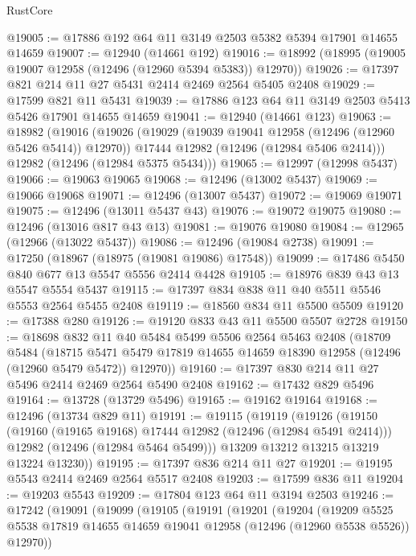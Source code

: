 \begin{lexlean}{RustCore}
\begin{coremodule}
@19005 := @17886 @192 @64 @11 @3149 @2503 @5382 @5394 @17901 @14655 @14659
@19007 := @12940 (@14661 @192)
@19016 := @18992 (@18995 (@19005 @19007 @12958 (@12496 (@12960 @5394 @5383)) @12970))
@19026 := @17397 @821 @214 @11 @27 @5431 @2414 @2469 @2564 @5405 @2408
@19029 := @17599 @821 @11 @5431
@19039 := @17886 @123 @64 @11 @3149 @2503 @5413 @5426 @17901 @14655 @14659
@19041 := @12940 (@14661 @123)
@19063 := @18982
    (@19016
      (@19026
        (@19029 (@19039 @19041 @12958 (@12496 (@12960 @5426 @5414)) @12970))
        @17444
        @12982
        (@12496 (@12984 @5406 @2414)))
      @12982
      (@12496 (@12984 @5375 @5434)))
@19065 := @12997 (@12998 @5437)
@19066 := @19063 @19065
@19068 := @12496 (@13002 @5437)
@19069 := @19066 @19068
@19071 := @12496 (@13007 @5437)
@19072 := @19069 @19071
@19075 := @12496 (@13011 @5437 @43)
@19076 := @19072 @19075
@19080 := @12496 (@13016 @817 @43 @13)
@19081 := @19076 @19080
@19084 := @12965 (@12966 (@13022 @5437))
@19086 := @12496 (@19084 @2738)
@19091 := @17250 (@18967 (@18975 (@19081 @19086) @17548))
@19099 := @17486 @5450 @840 @677 @13 @5547 @5556 @2414 @4428
@19105 := @18976 @839 @43 @13 @5547 @5554 @5437
@19115 := @17397 @834 @838 @11 @40 @5511 @5546 @5553 @2564 @5455 @2408
@19119 := @18560 @834 @11 @5500 @5509
@19120 := @17388 @280
@19126 := @19120 @833 @43 @11 @5500 @5507 @2728
@19150 := @18698
    @832
    @11
    @40
    @5484
    @5499
    @5506
    @2564
    @5463
    @2408
    (@18709
      @5484
      (@18715 @5471 @5479 @17819 @14655 @14659 @18390 @12958 (@12496 (@12960 @5479 @5472)) @12970))
@19160 := @17397 @830 @214 @11 @27 @5496 @2414 @2469 @2564 @5490 @2408
@19162 := @17432 @829 @5496
@19164 := @13728 (@13729 @5496)
@19165 := @19162 @19164
@19168 := @12496 (@13734 @829 @11)
@19191 := @19115
    (@19119
      (@19126
        (@19150
          (@19160 (@19165 @19168) @17444 @12982 (@12496 (@12984 @5491 @2414)))
          @12982
          (@12496 (@12984 @5464 @5499)))
        @13209
        @13212
        @13215
        @13219
        @13224
        @13230))
@19195 := @17397 @836 @214 @11 @27
@19201 := @19195 @5543 @2414 @2469 @2564 @5517 @2408
@19203 := @17599 @836 @11
@19204 := @19203 @5543
@19209 := @17804 @123 @64 @11 @3194 @2503
@19246 := @17242
    (@19091
      (@19099
        (@19105
          (@19191
            (@19201
              (@19204
                (@19209
                  @5525
                  @5538
                  @17819
                  @14655
                  @14659
                  @19041
                  @12958
                  (@12496 (@12960 @5538 @5526))
                  @12970))

\end{coremodule}
\end{lexlean}
